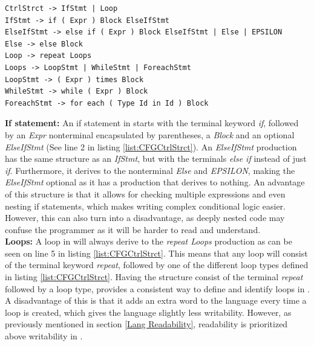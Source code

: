 \begin{lstlisting}[language=scriptkid, label={list:CFGCtrlStrct},caption=Control structure of \lang CFG]
CtrlStrct -> IfStmt | Loop   
IfStmt -> if ( Expr ) Block ElseIfStmt   
ElseIfStmt -> else if ( Expr ) Block ElseIfStmt | Else | EPSILON   
Else -> else Block   
Loop -> repeat Loops   
Loops -> LoopStmt | WhileStmt | ForeachStmt   
LoopStmt -> ( Expr ) times Block 
WhileStmt -> while ( Expr ) Block   
ForeachStmt -> for each ( Type Id in Id ) Block   

\end{lstlisting}

\noindent \textbf{If statement: } An if statement in \lang starts with the terminal keyword \textit{if}, followed by an \textit{Expr} nonterminal encapsulated by parentheses, a \textit{Block} and an optional \textit{ElseIfStmt} (See line 2 in listing \ref{list:CFGCtrlStrct}). An \textit{ElseIfStmt} production has the same structure as an \textit{IfStmt}, but with the terminals \textit{else if} instead of just \textit{if}. Furthermore, it derives to the nonterminal \textit{Else} and \textit{EPSILON}, making the \textit{ElseIfStmt} optional as it has a production that derives to nothing. An advantage of this structure is that it allows for checking multiple expressions and even nesting if statements, which makes writing complex conditional logic easier. However, this can also turn into a disadvantage, as deeply nested code may confuse the programmer as it will be harder to read and understand.\\


\textbf{Loops: } A loop in \lang will always derive to the \textit{repeat Loops} production as can be seen on line 5 in listing \ref{list:CFGCtrlStrct}. This means that any loop will consist of the terminal keyword \textit{repeat}, followed by one of the different loop types defined in listing \ref{list:CFGCtrlStrct}. Having the structure consist of the terminal \textit{repeat} followed by a loop type, provides a consistent way to define and identify loops in \lang. A disadvantage of this is that it adds an extra word to the language every time a loop is created, which gives the language slightly less writability. However, as previously mentioned in section \ref{Lang Readability}, readability is prioritized above writability in \lang.\\

